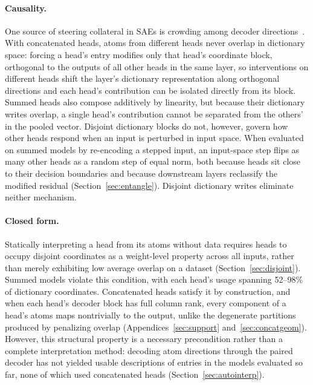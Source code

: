 \paragraph{Causality.}
One source of steering collateral in SAEs is crowding among decoder
directions~\cite{duan2026}. With concatenated heads, atoms from different
heads never overlap in dictionary space: forcing a head's entry modifies
only that head's coordinate block, orthogonal to the outputs of all other
heads in the same layer, so interventions on different heads shift the
layer's dictionary representation along orthogonal directions and each
head's contribution can be isolated directly from its block. Summed heads
also compose additively by linearity, but because their dictionary writes
overlap, a single head's contribution cannot be separated from the
others' in the pooled vector. Disjoint dictionary blocks do not, however,
govern how other heads respond when an input is perturbed in input space.
When evaluated on summed models by re-encoding a stepped input, an
input-space step flips as many other heads as a random step of equal
norm, both because heads sit close to their decision boundaries and
because downstream layers reclassify the modified residual
(Section~\ref{sec:entangle}). Disjoint dictionary writes eliminate
neither mechanism.

\paragraph{Closed form.}
Statically interpreting a head from its atoms without data requires heads
to occupy disjoint coordinates as a weight-level property across all
inputs, rather than merely exhibiting low average overlap on a dataset
(Section~\ref{sec:disjoint}). Summed models violate this condition, with
each head's usage spanning 52--98\% of dictionary coordinates.
Concatenated heads satisfy it by construction, and when each head's
decoder block has full column rank, every component of a head's atoms
maps nontrivially to the output, unlike the degenerate partitions
produced by penalizing overlap (Appendices~\ref{sec:support}
and~\ref{sec:concatgeom}). However, this structural property is a
necessary precondition rather than a complete interpretation method:
decoding atom directions through the paired decoder has not yielded
usable descriptions of entries in the models evaluated so far, none of
which used concatenated heads (Section~\ref{sec:autointerp}).

